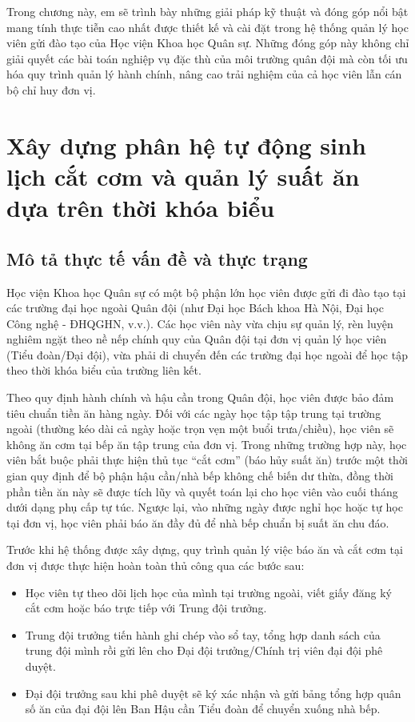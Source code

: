 \documentclass[../DoAn.tex]{subfiles}
\begin{document}
Trong chương này, em sẽ trình bày những giải pháp kỹ thuật và đóng góp nổi bật mang tính thực tiễn cao nhất được thiết kế và cài đặt trong hệ thống quản lý học viên gửi đào tạo của Học viện Khoa học Quân sự. Những đóng góp này không chỉ giải quyết các bài toán nghiệp vụ đặc thù của môi trường quân đội mà còn tối ưu hóa quy trình quản lý hành chính, nâng cao trải nghiệm của cả học viên lẫn cán bộ chỉ huy đơn vị.

\section{Xây dựng phân hệ tự động sinh lịch cắt cơm và quản lý suất ăn dựa trên thời khóa biểu}
\label{section:5.1}

\subsection{Mô tả thực tế vấn đề và thực trạng}
\label{subsection:5.1.1}
Học viện Khoa học Quân sự có một bộ phận lớn học viên được gửi đi đào tạo tại các trường đại học ngoài Quân đội (như Đại học Bách khoa Hà Nội, Đại học Công nghệ - ĐHQGHN, v.v.). Các học viên này vừa chịu sự quản lý, rèn luyện nghiêm ngặt theo nề nếp chính quy của Quân đội tại đơn vị quản lý học viên (Tiểu đoàn/Đại đội), vừa phải di chuyển đến các trường đại học ngoài để học tập theo thời khóa biểu của trường liên kết. 

Theo quy định hành chính và hậu cần trong Quân đội, học viên được bảo đảm tiêu chuẩn tiền ăn hàng ngày. Đối với các ngày học tập tập trung tại trường ngoài (thường kéo dài cả ngày hoặc trọn vẹn một buổi trưa/chiều), học viên sẽ không ăn cơm tại bếp ăn tập trung của đơn vị. Trong những trường hợp này, học viên bắt buộc phải thực hiện thủ tục ``cắt cơm'' (báo hủy suất ăn) trước một thời gian quy định để bộ phận hậu cần/nhà bếp không chế biến dư thừa, đồng thời phần tiền ăn này sẽ được tích lũy và quyết toán lại cho học viên vào cuối tháng dưới dạng phụ cấp tự túc. Ngược lại, vào những ngày được nghỉ học hoặc tự học tại đơn vị, học viên phải báo ăn đầy đủ để nhà bếp chuẩn bị suất ăn chu đáo.

Trước khi hệ thống được xây dựng, quy trình quản lý việc báo ăn và cắt cơm tại đơn vị được thực hiện hoàn toàn thủ công qua các bước sau:
\begin{itemize}
    \item Học viên tự theo dõi lịch học của mình tại trường ngoài, viết giấy đăng ký cắt cơm hoặc báo trực tiếp với Trung đội trưởng.
    \item Trung đội trưởng tiến hành ghi chép vào sổ tay, tổng hợp danh sách của trung đội mình rồi gửi lên cho Đại đội trưởng/Chính trị viên đại đội phê duyệt.
    \item Đại đội trưởng sau khi phê duyệt sẽ ký xác nhận và gửi bảng tổng hợp quân số ăn của đại đội lên Ban Hậu cần Tiểu đoàn để chuyển xuống nhà bếp.
\end{itemize}
\end{document}

